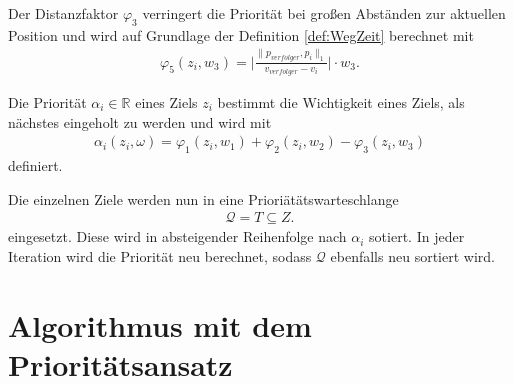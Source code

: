 \documentclass[german,version-2019-11]{uzl-thesis}
\begin{document}
Der Distanzfaktor $\varphi_3$ verringert die Priorität bei großen Abständen zur aktuellen Position und wird auf Grundlage der Definition \ref{def:WegZeit} berechnet mit
\begin{align}
\varphi_5(z_i, w_3) = \bigg\vert\frac{\|p_{verfolger},p_i\|_1}{v_{verfolger}-v_i}\bigg\vert \cdot w_3.
\end{align}
\begin{definition}
Die Priorität $\alpha_i\in\mathbb{R}$ eines Ziels $z_i$ bestimmt die Wichtigkeit eines Ziels, als nächstes eingeholt zu werden und wird mit
\begin{align*}
\alpha_i(z_i, \omega) = \varphi_1(z_i,w_1) + \varphi_2(z_i,w_2) - \varphi_3(z_i,w_3)
\end{align*}
definiert.
\end{definition}\noindent
Die einzelnen Ziele werden nun in eine Prioriätätswarteschlange
\begin{align*}
\mathcal{Q} = T\subseteq Z.
\end{align*}
eingesetzt. Diese wird in absteigender Reihenfolge nach $\alpha_i$ sotiert. In jeder Iteration wird die Priorität neu berechnet, sodass $\mathcal{Q}$ ebenfalls neu sortiert wird.

\section{Algorithmus mit dem Prioritätsansatz}
\end{document}
